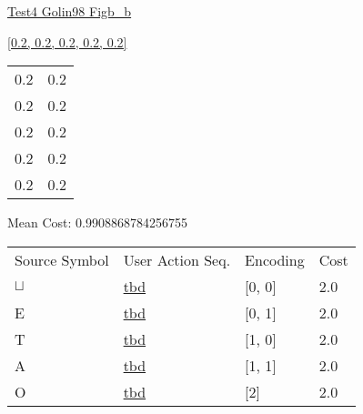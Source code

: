 \documentclass[12pt]{article}
\begin{document}
\noindent \url{Test4 Golin98 Figb_b}

\noindent \url{[0.2, 0.2, 0.2, 0.2, 0.2]}

\noindent\begin{tt}
\begin{small}
\begin{bundle}{}
\end{bundle}
\end{small}
\end{tt}
\newpage%
\begin{tabular}{l l}0.2	&	0.2\\
0.2	&	0.2\\
0.2	&	0.2\\
0.2	&	0.2\\
0.2	&	0.2\\
\end{tabular}\newpage
\noindent
\noindent Mean Cost: 0.9908868784256755\\
\begin{tabular}{l l l l}
Source Symbol	&	User Action Seq.	&	Encoding	&	Cost\\
$\sqcup$	&	\url{tbd}	&	[0, 0]	&	2.0\\
E	&	\url{tbd}	&	[0, 1]	&	2.0\\
T	&	\url{tbd}	&	[1, 0]	&	2.0\\
A	&	\url{tbd}	&	[1, 1]	&	2.0\\
O	&	\url{tbd}	&	[2]	&	2.0\\
\end{tabular}
\end{document}

